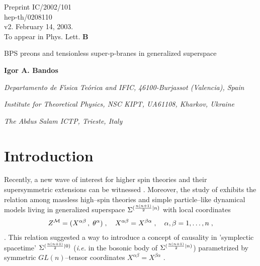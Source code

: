\documentclass[a4paper,11pt]{article}
\begin{document}
\begin{flushright}
Preprint IC/2002/101 \\ 
hep-th/0208110 \\ 
v2. February 14, 2003. \\ 
To appear in Phys. Lett. {\bf B} 
\end{flushright}

\begin{center}
{\Large
BPS preons and tensionless super-p-branes in generalized superspace} 

\bigskip 

{\bf Igor A. Bandos} 

\bigskip 

{\it Departamento de F\'{\i}sica Te\'orica and IFIC,} 
{\it  46100-Burjassot (Valencia), Spain}

{\it Institute for Theoretical Physics, NSC KIPT, 
UA61108, Kharkov, Ukraine} 

{\it The Abdus Salam ICTP, Trieste, Italy} 

\medskip 





\end{center}


\begin{abstract} 
\noindent
Tensionless super--p--branes in a generalized superspace with 
additional tensorial central charge coordinates may provide 
an extended object model for BPS preons, {\it i.e.} 
for the hypothetical constituents of M--theory preserving 31 of 32 
supersymmetries 
\cite{BPS01}.
   

\end{abstract}


\section{Introduction} 
 
Recently, a new wave of interest for higher spin theories and their 
supersymmetric extensions can be witnessed 
\cite{V01,V01s,Whs,V01c,Bars01,ESPS02}.
Moreover, the study of \cite{BLS99,V01s,V01c} exhibits the relation 
among massless high--spin theories and simple particle--like 
dynamical models 
\cite{BL98,BL98'} living in generalized superspace 
$\Sigma^{({n(n+1)\over 2}|n)}$ with local coordinates  
\begin{eqnarray}\label{ZM} 
Z^{{\cal M}}=(X^{\alpha\beta}\, , \; \theta^\alpha )\; , 
\quad X^{\alpha\beta}= X^{\beta\alpha}\; ,  
\quad \alpha, \beta = 1, \ldots , n \; , 
\end{eqnarray}
\cite{HP82C88,JdA00}.  
This relation suggested 
a way to introduce a concept of causality in 'symplectic spacetime' 
$\Sigma^{({n(n+1)\over 2}|0)}$ \cite{V01c} 
({\it i.e.} in the bosonic body of $\Sigma^{({n(n+1)\over 2}|n)}$) 
parametrized by  symmetric $GL(n)$--tensor coordinates 
$X^{\alpha\beta}=X^{\beta\alpha}$ \cite{Fr86}. 
\end{document}
